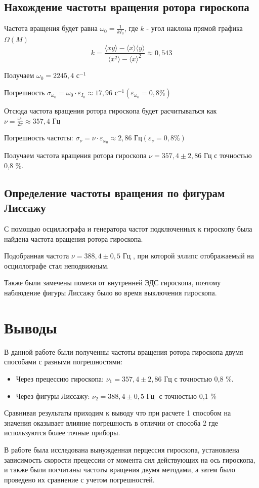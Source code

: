 \documentclass[a4paper]{article}
\begin{document}
\subsection{Нахождение частоты вращения ротора гироскопа}

Частота вращения будет равна $\omega_{0} = \frac{1}{kI_{0}}$, где $k$ - угол наклона прямой графика $\Omega(M)$
\[k=\frac{\langle xy\rangle-\langle x\rangle \langle y\rangle}{\langle x^2\rangle - \langle x\rangle^2}\approx 0,543\]

Получаем $\omega_{0} = 2245,4 \text{ с}^{-1}$

Погрешность $\sigma_{\omega_{0}} = \omega_{0} \cdot \varepsilon_{I_{0}} \approx 17,96 \text{ с}^{-1} (\varepsilon_{\omega_{0}} = 0,8\%)$

Отсюда частота вращения ротора гироскопа будет расчитываться как $\nu = \frac{\omega_{0}}{2\pi} \approx 357,4 \text{ Гц}$

Погрешность частоты: $\sigma_{\nu} = \nu \cdot \varepsilon_{\omega_{0}} \approx 2,86 \text{ Гц}(\varepsilon_{\nu} = 0,8\%) $

Получаем частота вращения ротора гироскопа $\nu = 357,4 \pm 2,86 \text{ Гц}$ с точностью 0,8 \%.

\subsection{Определение частоты вращения по фигурам Лиссажу}
С помощью осциллографа и генератора частот подключенных к гироскопу была найдена частота вращения ротора гироскопа.

Подобранная частота $\nu = 388,4 \pm 0,5 \text{ Гц }$, при которой эллипс отображаемый на осциллографе стал неподвижным. 

Также были замечены помехи от внутренней ЭДС гироскопа, поэтому наблюдение фигуры Лиссажу было во время выключения гироскопа.

\section{Выводы}

В данной работе были полученны частоты вращения ротора гироскопа двумя способами с разными погрешностями:
\begin{itemize}
    \item Через прецессию гироскопа: $\nu_{1} = 357,4 \pm 2,86 \text{ Гц}$ с точностью 0,8 \%.
    \item Через фигуры Лиссажу:      $\nu_{2} = 388,4 \pm 0,5 \text{  Гц }$ с точностью 0,1 \%
\end{itemize}

Сравнивая результаты приходим к выводу что при расчете 1 способом на значения оказывает влияние погрешность в отличии от способа 2 где используются более точные приборы.

В работе была исследована вынужденная перцессия гироскопа, установлена зависимость скорости прецессии от момента сил действующих на ось гироскопа, и также были посчитаны частоты вращения двумя методами, а затем было проведено их сравнение с учетом погрешностей.
\end{document}
